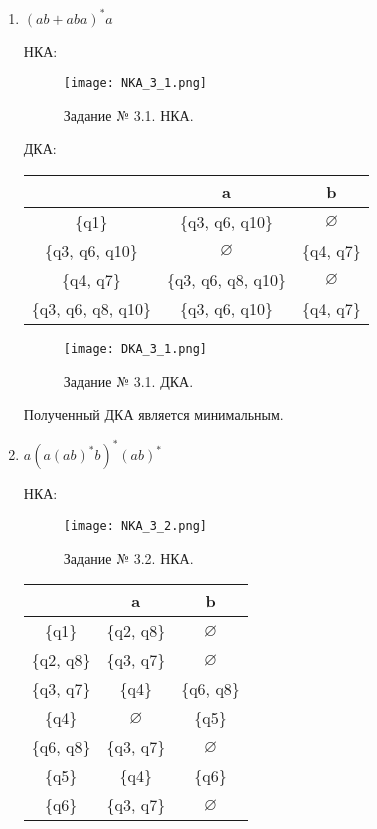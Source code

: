 \documentclass[a4paper, 12pt]{article}
\begin{document}
\begin{enumerate}

\item$(ab + aba)^*a$ 

 НКА:

\begin{figure}[!h]
\centering
\texttt{[image: NKA\_3\_1.png]}
\caption{Задание № 3.1. НКА.}
\end{figure}

 ДКА:

\begin{center}
\begin{tabular}{ |c|c|c| } 
\hline
\, & a & b \\
\hline
 \{q1\} & \{q3, q6, q10\} & $\varnothing$\\
\hline
 \{q3, q6, q10\} & $\varnothing$ & \{q4, q7\} \\
\hline
 \{q4, q7\} & \{q3, q6, q8, q10\} & $\varnothing$\\
\hline
 \{q3, q6, q8, q10\} &  \{q3, q6, q10\} &  \{q4, q7\} \\
\hline
\end{tabular}
\end{center}

\begin{figure}[h!]
\centering
\texttt{[image: DKA\_3\_1.png]}
\caption{Задание № 3.1. ДКА.}
\end{figure}

Полученный ДКА является минимальным.

\item$ a(a(ab)^*b)^*(ab)^* $ 

 НКА:

\begin{figure}[h!]
\centering
\texttt{[image: NKA\_3\_2.png]}
\caption{Задание № 3.2. НКА.}
\end{figure}

\begin{center}
\begin{tabular}{ |c|c|c| } 
\hline
\, & a & b \\
\hline
 \{q1\} & \{q2, q8\} & $\varnothing$ \\
\hline
 \{q2, q8\} & \{q3, q7\} & $\varnothing$ \\
\hline
 \{q3, q7\} & \{q4\} & \{q6, q8\} \\
\hline
 \{q4\} & $\varnothing$ &  \{q5\} \\
\hline
 \{q6, q8\} & \{q3, q7\} & $\varnothing$ \\
\hline
 \{q5\} & \{q4\} & \{q6\} \\
\hline
 \{q6\} & \{q3, q7\} & $\varnothing$ \\
\hline
\end{tabular}
\end{center}


\end{enumerate}
\end{document}
